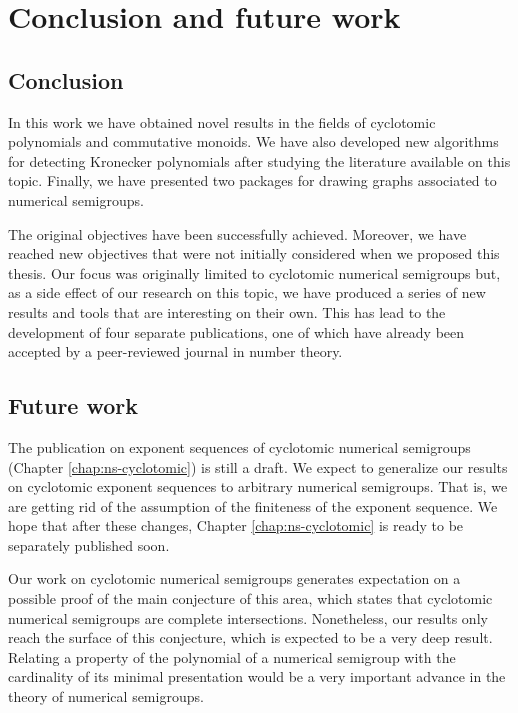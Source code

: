 

\chapter{Conclusion and future work}

\section{Conclusion}

In this work we have obtained novel results in the fields of cyclotomic polynomials and commutative monoids. We have also developed new algorithms for detecting Kronecker polynomials after studying the literature available on this topic. Finally, we have presented two packages for drawing graphs associated to numerical semigroups.

The original objectives have been successfully achieved. Moreover, we have reached new objectives that were not initially considered when we proposed this thesis. Our focus was originally limited to cyclotomic numerical semigroups but, as a side effect of our research on this topic, we have produced a series of new results and tools that are interesting on their own. This has lead to the development of four separate publications, one of which have already been accepted by a peer-reviewed journal in number theory.

\section{Future work}

The publication on exponent sequences of cyclotomic numerical semigroups (Chapter \ref{chap:ns-cyclotomic}) is still a draft. We expect to generalize our results on cyclotomic exponent sequences to arbitrary numerical semigroups. That is, we are getting rid of the assumption of the finiteness of the exponent sequence. We hope that after these changes, Chapter \ref{chap:ns-cyclotomic} is ready to be separately published soon.

Our work on cyclotomic numerical semigroups generates expectation on a possible proof of the main conjecture of this area, which states that cyclotomic numerical semigroups are complete intersections. Nonetheless, our results only reach the surface of this conjecture, which is expected to be a very deep result. Relating a property of the polynomial of a numerical semigroup with the cardinality of its minimal presentation would be a very important advance in the theory of numerical semigroups.

